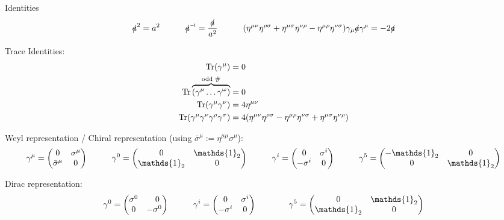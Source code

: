 			\noindent
			Identities
			\begin{equation}
				\slashed{a}^2 = a^2
				\hsp \inv{\slashed{a}} = \frac{\slashed{a}}{a^2}
				\hsp \qty(\eta^{\mu\nu}\eta^{\rho\sigma} + \eta^{\mu\sigma}\eta^{\nu\rho} - \eta^{\mu\rho}\eta^{\nu\sigma})
				\gamma_\mu \slashed{a} \gamma^\mu = -2 \slashed{a}
			\end{equation}

			\noindent
			Trace Identities:
			\begin{align}
				\Tr(\gamma^\mu) &= 0 \\
				\Tr\overbrace{({\gamma^\mu\dots\gamma^\omega})}^{\text{odd \#}} &= 0 \\
				\Tr(\gamma^\mu \gamma^\nu) &= 4 \eta^{\mu\nu} \\
				\Tr(\gamma^\mu \gamma^\nu \gamma^\rho \gamma^\sigma) &= 4\qty(\eta^{\mu\nu}\eta^{\rho\sigma} - \eta^{\mu\rho}\eta^{\nu\sigma} + \eta^{\mu\sigma}\eta^{\nu\rho})
			\end{align}

			\noindent
			Weyl representation / Chiral representation  (using $\bar{\sigma}^\mu := \eta^{\mu\mu}\sigma^\mu$):
			\begin{equation}
				\gamma^\mu = \mqty(
				0 & \sigma^\mu \\
				\bar{\sigma}^\mu & 0
				)
				\hsp
				\gamma^0 = \mqty(
				0 & \mathds{1}_2 \\
				\mathds{1}_2 & 0
				)
				\hsp
				\gamma^i = \mqty(
				0 & \sigma^i \\
				-\sigma^i & 0
				)
				\hsp
				\gamma^5 = \mqty(
				-\mathds{1}_2 & 0 \\
				0 & \mathds{1}_2
				)
			\end{equation}

			\noindent
			Dirac representation:
			\begin{equation}
				\begin{aligned}
					\gamma^0
					= \left( \begin{matrix}
							\sigma^0 & \M0       \\
							0        & -\sigma^0
						\end{matrix} \right)
					&\hsp
					\gamma^i = \mqty(
					0 & \sigma^i \\
					-\sigma^i & 0
					)
					&\hsp
					\gamma^5 = \mqty(
					0 & \mathds{1}_2 \\
					\mathds{1}_2 & 0
					)
				\end{aligned}
			\end{equation}

